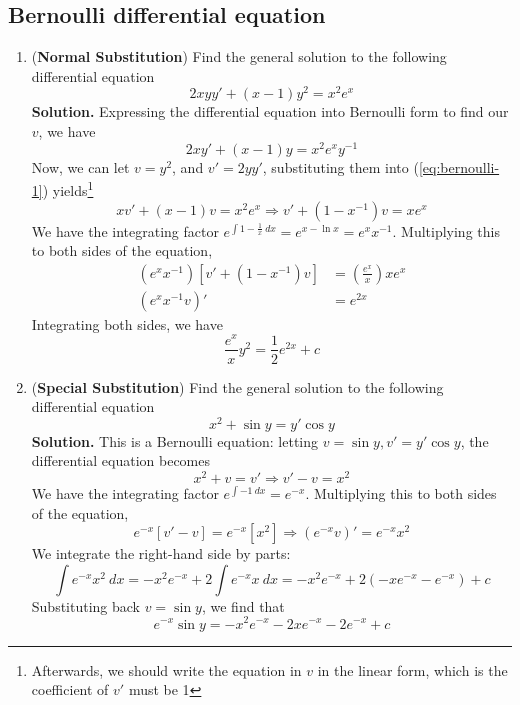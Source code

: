 \documentclass{article}
\begin{document}
\subsection{Bernoulli differential equation}
\begin{enumerate}
    \item (\textbf{Normal Substitution}) Find the general solution to the following differential equation
    \begin{equation} \label{eq:bernoulli-1}
        2xyy'+(x-1)y^2=x^2e^x
    \end{equation} 
    \textbf{Solution.} Expressing the differential equation into Bernoulli form to find our $v$, we have
    \begin{equation*}
        2xy'+(x-1)y=x^2e^xy^{-1}
    \end{equation*}
    Now, we can let $v=y^2$, and $v'=2yy'$, substituting them into (\ref{eq:bernoulli-1}) yields\footnote{Afterwards, we should write the equation in $v$ in the linear form, which is the coefficient of $v'$ must be 1}
    \begin{equation*}
        xv'+(x-1)v=x^2e^x \Rightarrow v'+(1-x^{-1})v=xe^x
    \end{equation*}
    We have the integrating factor $e^{\int 1-\frac{1}{x}~dx}=e^{x-\ln x}=e^xx^{-1}$. Multiplying this to both sides of the equation,
    \begin{align*}
        (e^xx^{-1})[v'+(1-x^{-1})v]&=(\frac{e^x}{x})xe^x \\
        (e^xx^{-1}v)'&=e^{2x}
    \end{align*}
    Integrating both sides, we have
    \begin{equation*}
        \frac{e^x}{x}y^2=\frac{1}{2}e^{2x}+c
    \end{equation*}
    \item (\textbf{Special Substitution}) Find the general solution to the following differential equation
    \begin{equation}
        x^2+\sin y=y'\cos y
    \end{equation}
    \textbf{Solution.} This is a Bernoulli equation: letting $v=\sin y,v'=y'\cos y$, the differential equation becomes
    \begin{equation*}
        x^2+v=v'\Rightarrow v'-v=x^2
    \end{equation*}
    We have the integrating factor $e^{\int-1~dx}=e^{-x}$. Multiplying this to both sides of the equation,
    \begin{equation*}
        e^{-x}[v'-v]=e^{-x}[x^2]\Rightarrow (e^{-x}v)'=e^{-x}x^2
    \end{equation*}
    We integrate the right-hand side by parts:
    \begin{equation*}
        \int e^{-x}x^2~dx=-x^2e^{-x}+2\int e^{-x}x~dx=-x^2e^{-x}+2(-xe^{-x}-e^{-x})+c
    \end{equation*}
    Substituting back $v=\sin y$, we find that
    \begin{equation*}
        e^{-x}\sin y=-x^2e^{-x}-2xe^{-x}-2e^{-x}+c
    \end{equation*}    
\end{enumerate}
\newpage
\end{document}
